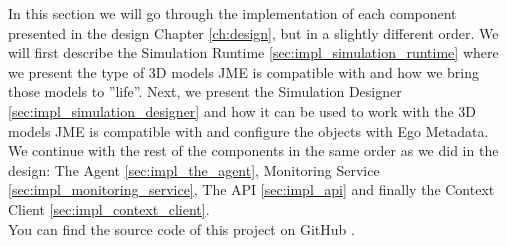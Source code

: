 In this section we will go through the implementation of each component presented in the design Chapter \ref{ch:design}, but in a slightly different order. We will first describe the Simulation Runtime \ref{sec:impl_simulation_runtime} where we present the type of 3D models JME is compatible with and how we bring those models to ''life''. Next, we present the Simulation Designer \ref{sec:impl_simulation_designer} and how it can be used to work with the 3D models JME is compatible with and configure the objects with Ego Metadata. We continue with the rest of the components in the same order as we did in the design: The Agent \ref{sec:impl_the_agent}, Monitoring Service \ref{sec:impl_monitoring_service}, The API \ref{sec:impl_api} and finally the Context Client \ref{sec:impl_context_client}.\\

You can find the source code of this project on GitHub \cite{egosim:online}.\\











